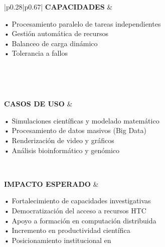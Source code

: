 \begin{table}[H]
\begin{tabular}{|p{0.28\textwidth}|p{0.67\textwidth}|}
		\textbf{CAPACIDADES}               &
		\begin{minipage}[t]{\linewidth}
			\vspace{2pt}
			• Procesamiento paralelo de tareas independientes \\
			• Gestión automática de recursos \\
			• Balanceo de carga dinámico \\
			• Tolerancia a fallos
			\vspace{2pt}
		\end{minipage}                                                                                                                                                                                                                             \\ \hline

		                                                                                                                                                                                                    \\ \hline

		\textbf{CASOS DE USO}              &
		\begin{minipage}[t]{\linewidth}
			\vspace{2pt}
			• Simulaciones científicas y modelado matemático \\
			• Procesamiento de datos masivos (Big Data) \\
			• Renderización de video y gráficos \\
			• Análisis bioinformático y genómico \\
			\vspace{2pt}
		\end{minipage}                                                                                                                                                                                                                              \\ \hline

		\textbf{IMPACTO ESPERADO}          &
		\begin{minipage}[t]{\linewidth}
			\vspace{2pt}
			• Fortalecimiento de capacidades investigativas \\
			• Democratización del acceso a recursos HTC \\
			• Apoyo a formación en computación distribuida \\
			• Incremento en productividad científica \\
			• Posicionamiento institucional en \HTC
			\vspace{2pt}
		\end{minipage}                                                                                                                                                                                                                               \\ \hline


\end{tabular}
\end{table}
